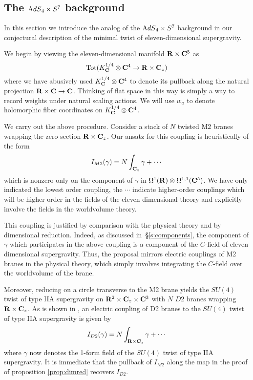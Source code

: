 \documentclass[../main.tex]{subfiles}
\begin{document}
\subsection{The ${\mathrm{A}dS}_4 \times S^7$ background}

In this section we introduce the analog of the ${\mathrm{A}dS}_4 \times S^7$ background in our conjectural description of the minimal twist of eleven-dimensional supergravity. 

\parsec[]

We begin by viewing the eleven-dimensional manifold $\mathbf{R}\times \mathbf{C}^5$ as 
\[
\operatorname{Tot}(K^{1/4}_{\mathbf{C}}\otimes \mathbf{C}^4\to \mathbf{R}\times \mathbf{C}_z)
\]
where we have abusively used $K^{1/4}_{\mathbf{C}}\otimes \mathbf{C}^4$ to denote its pullback along the natural projection $\mathbf{R}\times \mathbf{C}\to \mathbf{C}$. Thinking of flat space in this way is simply a way to record weights under natural scaling actions. We will use $w_a$ to denote holomorphic fiber coordinates on $K^{1/4}_{\mathbf{C}}\otimes \mathbf{C}^4$.

We carry out the above procedure. 
Consider a stack of $N$ twisted M2 branes wrapping the zero section $\mathbf{R}\times \mathbf{C}_z$.
Our ansatz for this coupling is heuristically of the form
\[
I_{M2}(\gamma) = N\int_{\mathbf{C}_z} \gamma + \cdots
\] 
which is nonzero only on the component of $\gamma$ in $\Omega^1(\mathbf{R})\otimes \Omega^{1,1}(\mathbf{C}^5)$. We have only indicated the lowest order coupling, the $\cdots$ indicate higher-order couplings which will be higher order in the fields of the eleven-dimensional theory and explicitly involve the fields in the worldvolume theory. 

This coupling is justified by comparison with the physical theory and by dimensional reduction. 
Indeed, as discussed in~\S\ref{s:components}, the component of $\gamma$ which participates in the above coupling is a component of the $C$-field of eleven dimensional supergravity. Thus, the proposal mirrors electric couplings of M2 branes in the physical theory, which simply involves integrating the $C$-field over the worldvolume of the brane. 

Moreover, reducing on a circle transverse to the M2 brane yields the $SU(4)$ twist of type IIA supergravity on $\mathbf{R}^2\times \mathbf{C}_z\times \mathbf{C}^3$ with $N$ $D2$ branes wrapping $\mathbf{R}\times \mathbf{C}_z$. As is shown in \cite{CLsugra}, an electric coupling of D2 branes to the $SU(4)$ twist of type IIA supergravity is given by 
\[
I_{D2}(\gamma) = N \int_{\mathbf{R}\times\mathbf{C}_z} \gamma + \cdots
\] 
where $\gamma$ now denotes the 1-form field of the $SU(4)$ twist of type IIA supergravity. It is immediate that the pullback of $I_{M2}$ along the map in the proof of proposition \ref{prop:dimred} recovers $I_{D2}$. 
\end{document}
